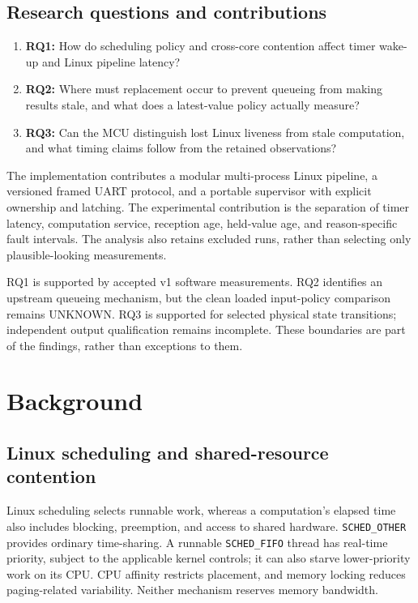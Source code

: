 \documentclass[a4paper,11pt]{article}
\newcommand{\page}{\clearpage}
\begin{document}
\subsection{Research questions and contributions}
\begin{enumerate}
\item \textbf{RQ1:} How do scheduling policy and cross-core contention affect timer wake-up and Linux pipeline latency?
\item \textbf{RQ2:} Where must replacement occur to prevent queueing from making results stale, and what does a latest-value policy actually measure?
\item \textbf{RQ3:} Can the MCU distinguish lost Linux liveness from stale computation, and what timing claims follow from the retained observations?
\end{enumerate}
The implementation contributes a modular multi-process Linux pipeline, a versioned framed UART protocol, and a portable supervisor with explicit ownership and latching. The experimental contribution is the separation of timer latency, computation service, reception age, held-value age, and reason-specific fault intervals. The analysis also retains excluded runs, rather than selecting only plausible-looking measurements.

RQ1 is supported by accepted v1 software measurements. RQ2 identifies an upstream queueing mechanism, but the clean loaded input-policy comparison remains UNKNOWN. RQ3 is supported for selected physical state transitions; independent output qualification remains incomplete. These boundaries are part of the findings, rather than exceptions to them.
\page
\section{Background}
\subsection{Linux scheduling and shared-resource contention}
Linux scheduling selects runnable work, whereas a computation's elapsed time also includes blocking, preemption, and access to shared hardware. \texttt{SCHED\_OTHER} provides ordinary time-sharing. A runnable \texttt{SCHED\_FIFO} thread has real-time priority, subject to the applicable kernel controls; it can also starve lower-priority work on its CPU. CPU affinity restricts placement, and memory locking reduces paging-related variability. Neither mechanism reserves memory bandwidth.
\end{document}
